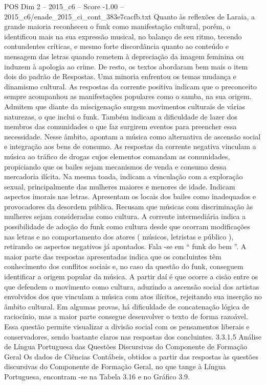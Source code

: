 \begin{textsample}{POS Dim 2 – 2015\_c6 – Score -1.00 – 2015\_c6/enade\_2015\_ci\_cont\_383e7cacfb.txt}
Quanto às reflexões de Laraia, a grande maioria reconheceu o funk como manifestação cultural, porém, o identificou mais na sua expressão musical, no balanço de seu ritmo, tecendo contundentes críticas, e mesmo forte discordância quanto ao conteúdo e mensagem das letras quando remetem à depreciação da imagem feminina ou induzem à apologia ao crime.
De resto, os textos abordaram bem mais o item dois do padrão de Respostas.
Uma minoria enfrentou os temas mudança e dinamismo cultural.
As respostas da corrente positiva indicam que o preconceito sempre acompanhou as manifestações populares como o samba, na sua origem.
Admitem que diante da miscigenação surgem movimentos culturais de várias naturezas, o que inclui o funk.
Também indicam a dificuldade de lazer dos membros das comunidades o que faz surgirem eventos para preencher essa necessidade.
Nesse âmbito, apontam a música como alternativa de ascensão social e integração aos bens de consumo.
As respostas da corrente negativa vinculam a música ao tráfico de drogas cujos elementos comandam as comunidades, propiciando que os bailes sejam mecanismos de venda e consumo dessa mercadoria ilícita.
Na mesma toada, indicam a vinculação com a exploração sexual, principalmente das mulheres maiores e menores de idade.
Indicam aspectos imorais nas letras.
Apresentam os locais dos bailes como inadequados e provocadores da desordem pública.
Recusam que músicas com discriminação às mulheres sejam consideradas como cultura.
A corrente intermediária indica a possibilidade de adoção do funk como cultura desde que ocorram modificações nas letras e no comportamento dos atores ( músicos, letristas e público ), retirando os aspectos negativos já apontados.
Fala -se em “ funk do bem ”.
A maior parte das respostas apresentadas indica que os concluintes têm conhecimento dos conflitos sociais e, no caso da questão do funk, conseguem identificar a origem popular da música.
A partir daí é que ocorre a cisão entre os que defendem o movimento como cultura, aduzindo a ascensão social dos artistas envolvidos dos que vinculam a música com atos ilícitos, rejeitando sua inserção no âmbito cultural.
Em algumas provas, há dificuldade de concatenação lógica de raciocínio, mas a maior parte consegue desenvolver o texto de forma razoável.
Essa questão permite visualizar a divisão social com os pensamentos liberais e conservadores, sendo bastante claros nas respostas dos concluintes. 3.3.1.5 Análise de Língua Portuguesa das Questões Discursivas do Componente de Formação Geral Os dados de Ciências Contábeis, obtidos a partir das respostas às questões discursivas do Componente de Formação Geral, no que tange à Língua Portuguesa, encontram -se na Tabela 3.16 e no Gráfico 3.9.

\end{textsample}
